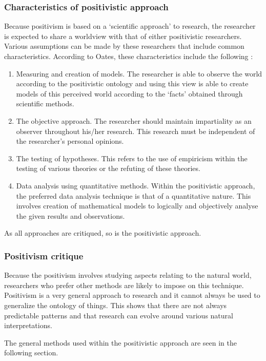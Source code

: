 \subsubsection{Characteristics of positivistic approach}
Because positivism is based on a ‘scientific approach’ to research, the researcher is expected to share a worldview with that of either positivistic researchers. Various assumptions can be made by these researchers that include common characteristics. According to Oates, these characteristics include the following \cite{OatesJ2006}: 
\begin{enumerate}[label=\roman*.]
	\item Measuring and creation of models. The researcher is able to observe the world according to the positivistic ontology and using this view is able to create models of this perceived world according to the ‘facts’ obtained through scientific methods.
	\item The objective approach. The researcher should maintain impartiality as an observer throughout his/her research. This research must be independent of the researcher’s personal opinions.
	\item The testing of hypotheses. This refers to the use of empiricism within the testing of various theories or the refuting of these theories.
	\item Data analysis using quantitative methods. Within the positivistic approach, the preferred data analysis technique is that of a quantitative nature. This involves creation of mathematical models to logically and objectively analyse the given results and observations.
\end{enumerate}

As all approaches are critiqued, so is the positivistic approach. 

\subsubsection{Positivism critique}
Because the positivism involves studying aspects relating to the natural world, researchers who prefer other methods are likely to impose on this technique. Positivism is a very general approach to research and it cannot always be used to generalize the ontology of things. This shows that there are not always predictable patterns and that research can evolve around various natural interpretations.

The general methods used within the positivistic approach are seen in the following section.


